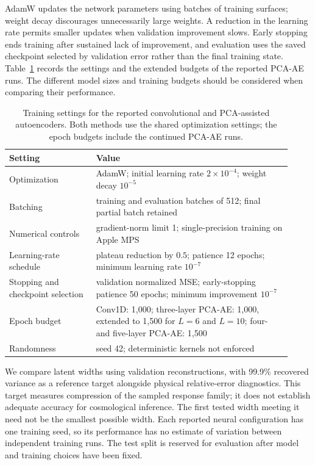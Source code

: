 AdamW updates the network parameters using batches of training surfaces;
weight decay discourages unnecessarily large weights. A reduction in the
learning rate permits smaller updates when validation improvement slows.
Early stopping ends training after sustained lack of improvement, and
evaluation uses the saved checkpoint selected by validation error rather
than the final training state. Table~\ref{tab:training-config-details}
records the settings and the extended budgets of the reported PCA-AE
runs. The different model sizes and training budgets should be considered
when comparing their performance.

\begin{table}[!htbp]
\centering
\caption{Training settings for the reported convolutional and PCA-assisted
autoencoders. Both methods use the shared optimization settings;
the epoch budgets include the continued PCA-AE runs.}
\label{tab:training-config-details}
\small
\begin{tabular}{@{}p{0.29\linewidth}p{0.63\linewidth}@{}}
\toprule
Setting & Value \\
\midrule
Optimization & AdamW; initial learning rate $2\times10^{-4}$;
weight decay $10^{-5}$ \\
Batching & training and evaluation batches of 512; final partial batch retained \\
Numerical controls & gradient-norm limit 1; single-precision training on Apple MPS \\
Learning-rate schedule & plateau reduction by $0.5$; patience 12 epochs;
minimum learning rate $10^{-7}$ \\
Stopping and checkpoint selection & validation normalized MSE;
early-stopping patience 50 epochs; minimum improvement $10^{-7}$ \\
Epoch budget & Conv1D: 1,000; three-layer PCA-AE: 1,000, extended to
1,500 for $L=6$ and $L=10$; four- and five-layer PCA-AE: 1,500 \\
Randomness & seed 42; deterministic kernels not enforced \\
\bottomrule
\end{tabular}
\end{table}

We compare latent widths using validation reconstructions, with 99.9\%
recovered variance as a reference target alongside physical relative-error
diagnostics. This target measures compression of the sampled response
family; it does not establish adequate accuracy for cosmological inference.
The first tested width meeting it need not be the smallest possible width.
Each reported neural configuration has one training seed, so its
performance has no estimate of variation between independent training
runs. The test split is reserved for evaluation after model and training
choices have been fixed.

